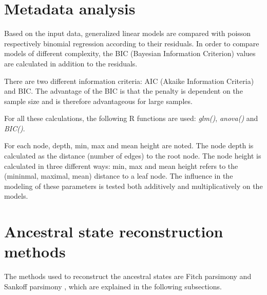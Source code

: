   \section{Metadata analysis}
    Based on the input data, generalized linear models are compared with poisson respectively binomial 
      regression according to their residuals. In order to compare models of different complexity, the 
      BIC (Bayesian Information Criterion) values are calculated in addition to the residuals.
      
    There are two different information criteria: AIC (Akaike Information Criteria) and BIC. The 
    advantage of the BIC is that the penalty is dependent on the sample size and is therefore 
      advantageous for large samples.
      
    For all these calculations, the following R functions are  used: \textit{glm()}, \textit{anova()} 
      and \textit{BIC()}.

    For each node, depth, min, max and mean height are  noted. The node depth is calculated as the
      distance (number of edges) to the root node. The node height is calculated in three different 
      ways: min, max and mean height refers to the (mininmal, maximal, mean) distance to a leaf node.
      The influence in the modeling of these parameters is tested both additively and multiplicatively 
      on the models.

  \section{Ancestral state reconstruction methods}
    The methods used to reconstruct the ancestral states are Fitch parsimony \cite{Fitch1971} and 
      Sankoff parsimony \cite{Sankoff1975}, which are explained in the following subsections.

